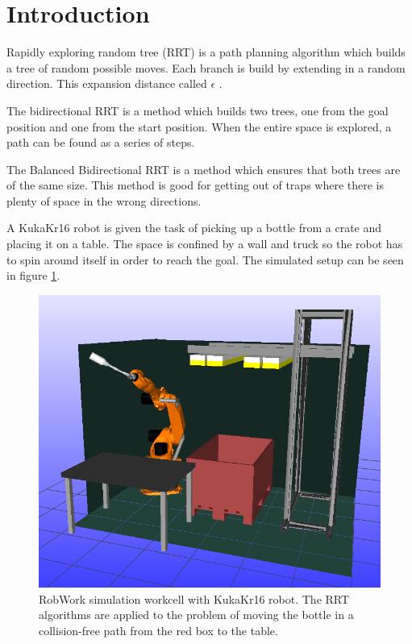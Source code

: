 \section{Introduction} 
Rapidly exploring random tree (RRT) is a path planning algorithm which builds a tree of random possible moves. 
Each branch is build by extending in a random direction.
This expansion distance called \(\epsilon\) \citep{pathplanning}.

The bidirectional RRT is a method which builds two trees, one from the goal position and one from the start position. 
When the entire space is explored, a path can be found as a series of steps.

The Balanced Bidirectional RRT is a method which ensures that both trees are of the same size. 
This method is good for getting out of traps where there is plenty of space in the wrong directions.

A KukaKr16 robot is given the task of picking up a bottle from a crate and placing it on a table.
The space is confined by a wall and truck so the robot has to spin around itself in order to reach the goal.
The simulated setup can be seen in figure \ref{fig:worckcell_bottle_picked}.

\begin{figure}[h]
 \centering
 \includegraphics[width=\figsize]{graphics/robworkpic}
 \caption{RobWork simulation workcell with KukaKr16 robot.
 The RRT algorithms are applied to the problem of moving the bottle
 in a collision-free path from the red box to the table.}
 \label{fig:worckcell_bottle_picked}
\end{figure}

